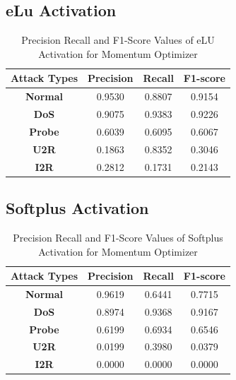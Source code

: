\documentclass[12pt, a4paper]{report}
\begin{document}
\begin{appendices}
	\subsection{eLu Activation}
 	  \begin{table}[h]
		\centering
		\captionsetup{justification=centering,margin=2cm}
		\begin{tabular}{|c|c|c|c|}
		\hline
		\textbf{Attack Types} & \textbf{Precision} & \textbf{Recall} & \textbf{F1-score} \\ \hline
		\textbf{Normal}       & 0.9530             & 0.8807          & 0.9154            \\ \hline
		\textbf{DoS}          & 0.9075             & 0.9383          & 0.9226            \\ \hline
		\textbf{Probe}        & 0.6039             & 0.6095          & 0.6067            \\ \hline
		\textbf{U2R}          & 0.1863             & 0.8352          & 0.3046            \\ \hline
		\textbf{I2R}          & 0.2812             & 0.1731          & 0.2143            \\ \hline
		\end{tabular}
		\caption{Precision Recall and F1-Score Values of eLU Activation for Momentum Optimizer}
		\label{classification elu Momentum tflearn}
		\end{table} 

	\subsection{Softplus Activation}
 	  \begin{table}[h]
		\centering
		\captionsetup{justification=centering,margin=2cm}
		\begin{tabular}{|c|c|c|c|}
		\hline
		\textbf{Attack Types} & \textbf{Precision} & \textbf{Recall} & \textbf{F1-score} \\ \hline
		\textbf{Normal}       & 0.9619             & 0.6441          & 0.7715            \\ \hline
		\textbf{DoS}          & 0.8974             & 0.9368          & 0.9167            \\ \hline
		\textbf{Probe}        & 0.6199             & 0.6934          & 0.6546            \\ \hline
		\textbf{U2R}          & 0.0199             & 0.3980          & 0.0379            \\ \hline
		\textbf{I2R}          & 0.0000             & 0.0000          & 0.0000            \\ \hline
		\end{tabular}
		\caption{Precision Recall and F1-Score Values of Softplus Activation for Momentum Optimizer}
		\label{classification softplus Momentum tflearn}
		\end{table} 


\end{appendices}
\end{document}
